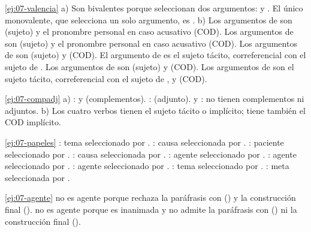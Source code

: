 \begin{solucion}{\ref{ej:07-valencia}}
a) Son bivalentes porque seleccionan dos argumentos:  y . El único monovalente, que selecciona un
solo argumento, es . b) Los argumentos de  son
 (sujeto) y el pronombre personal en caso acusativo
 (COD). Los argumentos de  son  (sujeto) y el pronombre personal en caso acusativo 
(COD). Los argumentos de  son  (sujeto) y
 (COD). El argumento de  es el
sujeto tácito, correferencial con el sujeto de . Los argumentos
de  son  (sujeto) y
 (COD). Los argumentos de  son el sujeto
tácito, correferencial con el sujeto de , y  (COD).
\end{solucion}

\begin{solucion}{\ref{ej:07-compadj}}
a) :  y 
(complementos). :  (adjunto).  y
: no tienen complementos ni adjuntos. b) Los cuatro
verbos tienen el sujeto tácito o implícito;  tiene también el COD
implícito.
\end{solucion}

\begin{solucion}{\ref{ej:07-papeles}}
: tema seleccionado por . : causa seleccionada por . : paciente seleccionado por .
: causa seleccionada por .
: agente seleccionado por . :
agente seleccionado por . : agente seleccionado por . : tema
seleccionado por . : meta seleccionada
por .
\end{solucion}

\begin{solucion}{\ref{ej:07-agente}}
 no es agente porque rechaza la paráfrasis con 
() y la construcción final
().  no es agente porque es inanimada y
no admite la paráfrasis con  () ni la construcción final ().
\end{solucion}

